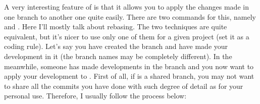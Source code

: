 A very interesting feature of  is that it allows you to apply the changes made in one branch to another one quite easily.
There are two commands for this, namely  and .
Here I'll mostly talk about rebasing. The two techniques are quite equivalent, but it's nicer to use only one of them for a given project (set it as a coding rule).
Let's say you have created the branch  and have made your development in it (the branch names may be completely different).
In the meanwhile, someone has made developments in the branch  and you now want to apply your development to .
First of all, if  is a shared branch, you may not want to share all the commits you have done with such degree of detail as for your personal use.
Therefore, I usually follow the process below:

